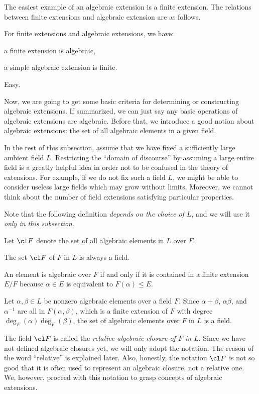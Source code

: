 \documentclass{../note}
\begin{document}
The easiest example of an algebraic extension is a finite extension.
The relations between finite extensions and algebraic extension are as follows.

\begin{prop}
For finite extensions and algebraic extensions, we have:
\begin{parts}
\item a finite extension is algebraic,
\item a simple algebraic extension is finite.
\end{parts}
\end{prop}
\begin{pf} Easy. \end{pf}

Now, we are going to get some basic criteria for determining or constructing algebraic extensions.
If summarized, we can just say any basic operations of algebraic extensions are algebraic.
Before that, we introduce a good notion about algebraic extensions: the set of all algebraic elements in a given field.

In the rest of this subsection, assume that we have fixed a sufficiently large ambient field $L$.
Restricting the ``domain of discourse'' by assuming a large entire field is a greatly helpful idea in order not to be confused in the theory of extensions.
For example, if we do not fix such a field $L$, we might be able to consider useless large fields which may grow without limits.
Moreover, we cannot think about the number of field extensions satisfying particular properties.

Note that the following definition \emph{depends on the choice of $L$}, and we will use it \emph{only in this subsection}.
\begin{defn}
Let $\cl F$ denote the set of all algebraic elements in $L$ over $F$.
\end{defn}
\begin{prop}
The set $\cl F$ of $F$ in $L$ is always a field.
\end{prop}
\begin{pf}
An element is algebraic over $F$ if and only if it is contained in a finite extension $E/F$ because $\alpha\in E$ is equivalent to $F(\alpha)\le E$.

Let $\alpha,\beta\in L$ be nonzero algebraic elements over a field $F$.
Since $\alpha+\beta$, $\alpha\beta$, and $\alpha^{-1}$ are all in $F(\alpha,\beta)$, which is a finite extension of $F$ with degree $\deg_F(\alpha)\deg_F(\beta)$, the set of algebraic elements over $F$ in $L$ is a field.
\end{pf}
\begin{rmk}
The field $\cl F$ is called the \emph{relative algebraic closure of $F$ in $L$}.
Since we have not defined algebraic closures yet, we will only adopt the notation.
The reason of the word ``relative'' is explained later.
Also, honestly, the notation $\cl F$ is not so good that it is often used to represent an algebraic closure, not a relative one.
We, however, proceed with this notation to grasp concepts of algebraic extensions.
\end{rmk}
\end{document}
